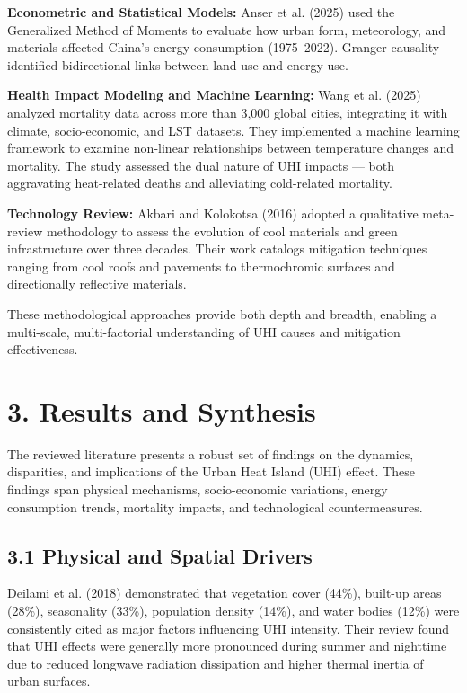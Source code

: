 \documentclass[draft]{agujournal}
\begin{document}
\textbf{Econometric and Statistical Models:} Anser et al. (2025) used the Generalized Method of Moments to evaluate how urban form, meteorology, and materials affected China’s energy consumption (1975–2022). Granger causality identified bidirectional links between land use and energy use.

\textbf{Health Impact Modeling and Machine Learning:} Wang et al. (2025) analyzed mortality data across more than 3,000 global cities, integrating it with climate, socio-economic, and LST datasets. They implemented a machine learning framework to examine non-linear relationships between temperature changes and mortality. The study assessed the dual nature of UHI impacts — both aggravating heat-related deaths and alleviating cold-related mortality.

\textbf{Technology Review:} Akbari and Kolokotsa (2016) adopted a qualitative meta-review methodology to assess the evolution of cool materials and green infrastructure over three decades. Their work catalogs mitigation techniques ranging from cool roofs and pavements to thermochromic surfaces and directionally reflective materials.

These methodological approaches provide both depth and breadth, enabling a multi-scale, multi-factorial understanding of UHI causes and mitigation effectiveness.

\section*{3. Results and Synthesis}

The reviewed literature presents a robust set of findings on the dynamics, disparities, and implications of the Urban Heat Island (UHI) effect. These findings span physical mechanisms, socio-economic variations, energy consumption trends, mortality impacts, and technological countermeasures.

\subsection*{3.1 Physical and Spatial Drivers}

Deilami et al. (2018) demonstrated that vegetation cover (44\%), built-up areas (28\%), seasonality (33\%), population density (14\%), and water bodies (12\%) were consistently cited as major factors influencing UHI intensity. Their review found that UHI effects were generally more pronounced during summer and nighttime due to reduced longwave radiation dissipation and higher thermal inertia of urban surfaces.
\end{document}
